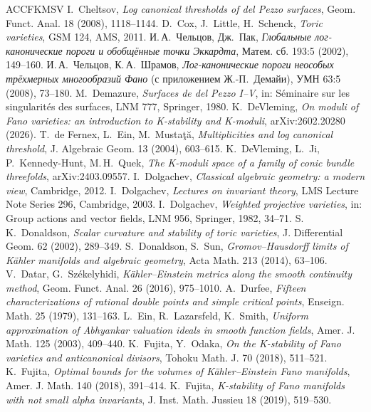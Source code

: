 \documentclass[11pt,a4paper]{article}
\theoremstyle{plain}
\theoremstyle{definition}
\theoremstyle{remark}
\begin{document}
\begin{thebibliography}{ACCFKMSV}
 I.~Cheltsov, \emph{Log canonical thresholds of del Pezzo surfaces}, Geom. Funct. Anal. 18 (2008), 1118--1144.
 D.~Cox, J.~Little, H.~Schenck, \emph{Toric varieties}, GSM 124, AMS, 2011.
 И.\,А.~Чельцов, Дж.~Пак, \emph{Глобальные лог-канонические пороги и обобщённые точки Эккардта}, Матем. сб. 193:5 (2002), 149--160.
 И.\,А.~Чельцов, К.\,А.~Шрамов, \emph{Лог-канонические пороги неособых трёхмерных многообразий Фано} (с приложением Ж.-П.~Демайи), УМН 63:5 (2008), 73--180.
 M.~Demazure, \emph{Surfaces de del Pezzo I--V}, in: S\'eminaire sur les singularit\'es des surfaces, LNM 777, Springer, 1980.
 K.~DeVleming, \emph{On moduli of Fano varieties: an introduction to K-stability and K-moduli}, arXiv:2602.20280 (2026).
 T.~de Fernex, L.~Ein, M.~Musta\c t\u a, \emph{Multiplicities and log canonical threshold}, J. Algebraic Geom. 13 (2004), 603--615.
 K.~DeVleming, L.~Ji, P.~Kennedy-Hunt, M.\,H.~Quek, \emph{The K-moduli space of a family of conic bundle threefolds}, arXiv:2403.09557.
 I.~Dolgachev, \emph{Classical algebraic geometry: a modern view}, Cambridge, 2012.
 I.~Dolgachev, \emph{Lectures on invariant theory}, LMS Lecture Note Series 296, Cambridge, 2003.
 I.~Dolgachev, \emph{Weighted projective varieties}, in: Group actions and vector fields, LNM 956, Springer, 1982, 34--71.
 S.\,K.~Donaldson, \emph{Scalar curvature and stability of toric varieties}, J. Differential Geom. 62 (2002), 289--349.
 S.~Donaldson, S.~Sun, \emph{Gromov--Hausdorff limits of K\"ahler manifolds and algebraic geometry}, Acta Math. 213 (2014), 63--106.
 V.~Datar, G.~Sz\'ekelyhidi, \emph{K\"ahler--Einstein metrics along the smooth continuity method}, Geom. Funct. Anal. 26 (2016), 975--1010.
 A.~Durfee, \emph{Fifteen characterizations of rational double points and simple critical points}, Enseign. Math. 25 (1979), 131--163.
 L.~Ein, R.~Lazarsfeld, K.~Smith, \emph{Uniform approximation of Abhyankar valuation ideals in smooth function fields}, Amer. J. Math. 125 (2003), 409--440.
 K.~Fujita, Y.~Odaka, \emph{On the K-stability of Fano varieties and anticanonical divisors}, Tohoku Math. J. 70 (2018), 511--521.
 K.~Fujita, \emph{Optimal bounds for the volumes of K\"ahler--Einstein Fano manifolds}, Amer. J. Math. 140 (2018), 391--414.
 K.~Fujita, \emph{K-stability of Fano manifolds with not small alpha invariants}, J. Inst. Math. Jussieu 18 (2019), 519--530.

\end{thebibliography}
\end{document}
